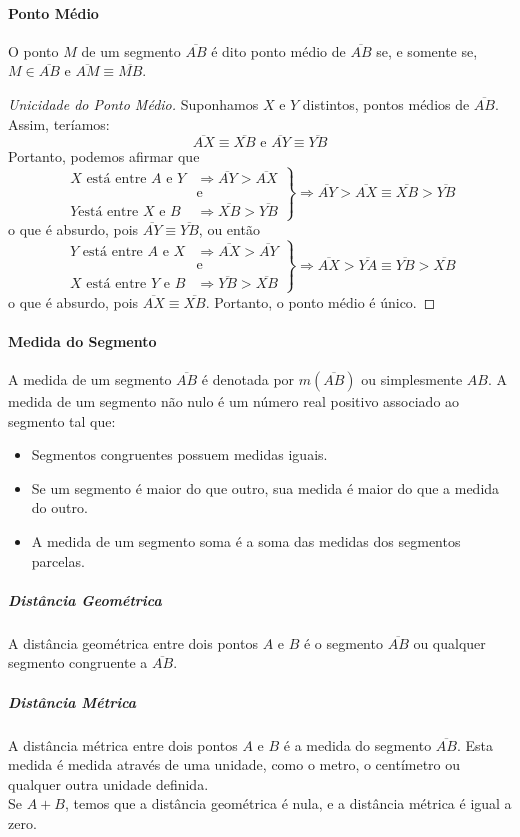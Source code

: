 \paragraph{Ponto Médio} \begin{df}
O ponto $M$ de um segmento $\overline{AB}$ é dito ponto médio de $\overline{AB}$ se, e somente se, $M \in \overline{AB}$ e $\overline{AM} \equiv \overline{MB}$.
\begin{proof}[Unicidade do Ponto Médio]
Suponhamos $X$ e $Y$ distintos, pontos médios de $\overline{AB}$. Assim, teríamos: \[\overline{AX} \equiv \overline{XB} \textrm{ e } \overline{AY} \equiv \overline{YB}\]
Portanto, podemos afirmar que
\[ \left. \begin{array}{ll}
			X\textrm{ está entre }A\textrm{ e }Y &\Rightarrow \overline{AY} > \overline{AX}\\
            &\textrm{e}\\
			Y\textrm{está entre }X\textrm{ e }B &\Rightarrow \overline{XB}>\overline{YB} \end{array} \right\} \Rightarrow \overline{AY}>\overline{AX}\equiv \overline{XB}>\overline{YB}\]
o que é absurdo, pois $\overline{AY} \equiv \overline{YB}$, ou então
\[ \left. \begin{array}{ll}
			Y\textrm{ está entre }A\textrm{ e }X &\Rightarrow \overline{AX} > \overline{AY}\\
			&\textrm{e}\\
			X\textrm{ está entre }Y\textrm{ e }B &\Rightarrow \overline{YB} > \overline{XB}
		\end{array} \right\} \Rightarrow \overline{AX}>\overline{YA}\equiv \overline{YB} > \overline{XB}\]
        o que é absurdo, pois $\overline{AX}\equiv \overline{XB}$. Portanto, o ponto médio é único.
\end{proof}
\end{df}

\paragraph{Medida do Segmento} A medida de um segmento $\overline{AB}$ é denotada por $m(\overline{AB})$ ou simplesmente $AB$. A medida de um segmento não nulo é um número real positivo associado ao segmento tal que:
\begin{itemize}
\item Segmentos congruentes possuem medidas iguais.
\item Se um segmento é maior do que outro, sua medida é maior do que a medida do outro.
\item A medida de um segmento soma é a soma das medidas dos segmentos parcelas.
\end{itemize}
\subparagraph{Distância Geométrica} A distância geométrica entre dois pontos $A$ e $B$ é o segmento $\overline{AB}$ ou qualquer segmento congruente a $\overline{AB}$.
\subparagraph{Distância Métrica} A distância métrica entre dois pontos $A$ e $B$ é a medida do segmento $\overline{AB}$. Esta medida é medida através de uma unidade, como o metro, o centímetro ou qualquer outra unidade definida. \\ 
Se $A+B$, temos que a distância geométrica é nula, e a distância métrica é igual a zero.

